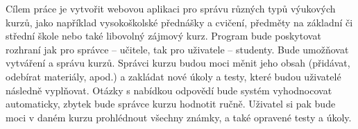 \documentclass[12pt]{report}
\begin{document}

Cílem práce je vytvořit webovou aplikaci pro správu různých typů výukových kurzů, jako například vysokoškolské přednášky a cvičení, předměty na základní či střední škole nebo také libovolný zájmový kurz. 
Program bude poskytovat rozhraní jak pro správce – učitele, tak pro uživatele – studenty. Bude umožňovat vytváření a správu kurzů. 
Správci kurzu budou moci měnit jeho obsah (přidávat, odebírat materiály, apod.) a zakládat nové úkoly a testy, které budou uživatelé následně vyplňovat. 
Otázky s nabídkou odpovědí bude systém vyhodnocovat automaticky, zbytek bude správce kurzu hodnotit ručně. 
Uživatel si pak bude moci v daném kurzu prohlédnout všechny známky, a také opravené testy a úkoly.
\end{document}
